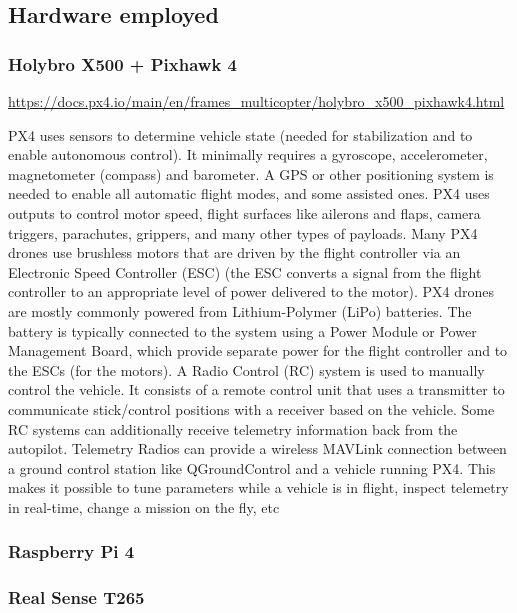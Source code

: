 \subsection{Hardware employed}
\subsubsection{Holybro X500 + Pixhawk 4}
\url{https://docs.px4.io/main/en/frames_multicopter/holybro_x500_pixhawk4.html}

PX4 uses sensors to determine vehicle state (needed for stabilization and to enable autonomous control).
It minimally requires a gyroscope, accelerometer, magnetometer (compass) and barometer.
A GPS or other positioning system is needed to enable all automatic flight modes, and some assisted ones.
PX4 uses outputs to control motor speed, flight surfaces like ailerons and flaps, camera triggers, parachutes, grippers, and many other types of payloads.
Many PX4 drones use brushless motors that are driven by the flight controller via an Electronic Speed Controller (ESC) 
(the ESC converts a signal from the flight controller to an appropriate level of power delivered to the motor).
PX4 drones are mostly commonly powered from Lithium-Polymer (LiPo) batteries. 
The battery is typically connected to the system using a Power Module or Power Management Board, 
which provide separate power for the flight controller and to the ESCs (for the motors).
A Radio Control (RC) system is used to manually control the vehicle. 
It consists of a remote control unit that uses a transmitter to communicate stick/control positions with a receiver based on the vehicle. 
Some RC systems can additionally receive telemetry information back from the autopilot.
Telemetry Radios can provide a wireless MAVLink connection between a ground control station like QGroundControl and a vehicle running PX4. 
This makes it possible to tune parameters while a vehicle is in flight, inspect telemetry in real-time, change a mission on the fly, etc


\subsubsection{Raspberry Pi 4}
\subsubsection{Real Sense T265}